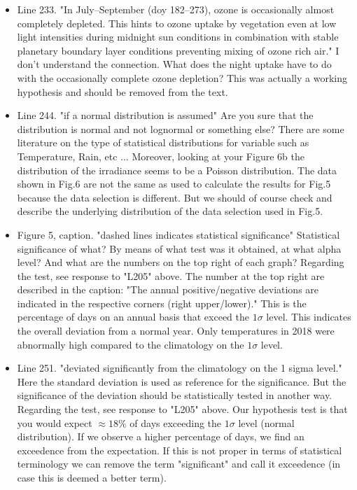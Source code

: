 \documentclass{scrartcl}
\begin{document}
\begin{itemize}
\item {\color{blue}Line 233. "In July--September (doy 182--273), ozone is occasionally almost completely depleted. This hints to ozone uptake by vegetation even at low light intensities during midnight sun conditions in combination with stable planetary boundary layer conditions preventing mixing of ozone rich air."
I don't understand the connection. What does the night uptake have to do with the
occasionally complete ozone depletion?} This was actually a working hypothesis and should be removed from the text.

\item {\color{blue}Line 244. "if a normal distribution is assumed" 
Are you sure that the distribution is normal and not lognormal or something else? There are some literature on the type of statistical distributions for variable such as Temperature, Rain, etc ...
Moreover, looking at your Figure 6b the distribution of the irradiance seems to be a
Poisson distribution.}
The data shown in Fig.6 are not the same as used to calculate the results for Fig.5 because the data selection is different. But we should of course check and describe the underlying distribution of the data selection used in Fig.5.

\item {\color{blue}Figure 5, caption. "dashed lines indicates statistical significance" Statistical significance of what? By means of what test was it obtained, at what alpha level? And what are the numbers on the top right of each graph?}
Regarding the test, see response to "L205" above. The number at the top right are described in the caption: "The annual positive/negative deviations are indicated in the respective corners (right upper/lower)." This is the percentage of days on an annual basis that exceed the $1\sigma$ level. This indicates the overall deviation from a normal year. Only temperatures in 2018 were abnormally high compared to the climatology on the $1\sigma$ level.

\item {\color{blue}Line 251. "deviated significantly from the climatology on the 1 sigma level." Here the standard deviation is used as reference for the significance. But the significance of the deviation should be statistically tested in another way.}
Regarding the test, see response to "L205" above. Our hypothesis test is that you would expect $\approx18\%$ of days exceeding the $1\sigma$ level (normal distribution). If we observe a higher percentage of days, we find an exceedence from the expectation. If this is not proper in terms of statistical terminology we can remove the term "significant" and call it exceedence (in case this is deemed a better term).


\end{itemize}
\end{document}
